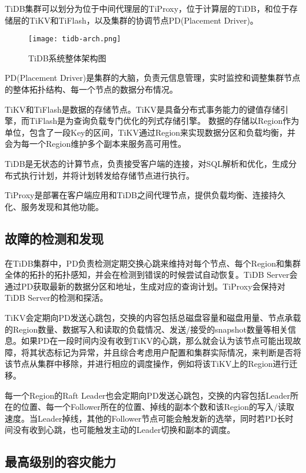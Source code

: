 TiDB集群可以划分为位于中间代理层的TiProxy，位于计算层的TiDB，和位于存储层的TiKV和TiFlash，以及集群的协调节点PD(Placement Driver)。

\begin{figure}
  \centering
  \texttt{[image: tidb-arch.png]}
  \caption{TiDB系统整体架构图}
  \label{fig:tidb-arch}
\end{figure}

PD(Placement Driver)是集群的大脑，负责元信息管理，实时监控和调整集群节点的整体拓扑结构、每一个节点的数据分布情况。

TiKV和TiFlash是数据的存储节点。TiKV是具备分布式事务能力的键值存储引擎，而TiFlash是为查询负载专门优化的列式存储引擎。
数据的存储以Region作为单位，包含了一段Key的区间，TiKV通过Region来实现数据分区和负载均衡，并会为每一个Region维护多个副本来服务高可用性。

TiDB是无状态的计算节点，负责接受客户端的连接，对SQL解析和优化，生成分布式执行计划，并将计划转发给存储节点进行执行。

TiProxy是部署在客户端应用和TiDB之间代理节点，提供负载均衡、连接持久化、服务发现和其他功能。


\subsection{故障的检测和发现}

在TiDB集群中，PD负责检测定期交换心跳来维持对每个节点、每个Region和集群全体的拓扑的拓扑感知，并会在检测到错误的时候尝试自动恢复。TiDB Server会通过PD获取最新的数据分区和地址，生成对应的查询计划。TiProxy会保持对TiDB Server的检测和探活。

TiKV会定期向PD发送心跳包，交换的内容包括总磁盘容量和磁盘用量、节点承载的Region数量、数据写入和读取的负载情况、发送/接受的snapshot数量等相关信息。如果PD在一段时间内没有收到TiKV的心跳，那么就会认为该节点可能出现故障，将其状态标记为异常，并且综合考虑用户配置和集群实际情况，来判断是否将该节点从集群中移除，并进行相应的调度操作，例如将该TiKV上的Region进行迁移。

每一个Region的Raft Leader也会定期向PD发送心跳包，交换的内容包括Leader所在的位置、每一个Follower所在的位置、掉线的副本个数和该Region的写入/读取速度。当Leader掉线，其他的Follower节点可能会触发新的选举，同时若PD长时间没有收到心跳，也可能触发主动的Leader切换和副本的调度。

\subsection{最高级别的容灾能力}

